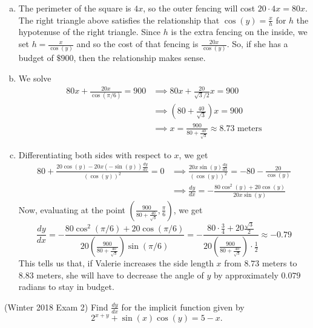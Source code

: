 \documentclass[11pt]{exam}
\newcommand{\dydx}{\frac{dy}{dx}}
\begin{document}
\begin{questions}
\begin{enumerate}[(a)]
\end{enumerate}
\begin{solution}
  \begin{enumerate}[(a)]
  \item The perimeter of the square is \(4x\), so the outer fencing
    will cost \(20 \cdot 4x = 80x\). The right triangle above
    satisfies the relationship that \(\cos(y) = \frac{x}{h}\) for
    \(h\) the hypotenuse of the right triangle. Since \(h\) is the
    extra fencing on the inside, we set \(h = \frac{x}{\cos(y)}\) and
    so the cost of that fencing is \(\frac{20x}{\cos(y)}\). So, if she
    has a budget of \(\$900\), then the relationship makes sense.
  \item We solve
    \begin{align*}
      80x + \frac{20x}{\cos(\pi/6)} = 900
      & \implies 80x + \frac{20}{\sqrt{3}/2} x = 900 \\
      & \implies \left(80+\frac{40}{\sqrt{3}}\right) x = 900 \\
      & \implies x = \frac{900}{80+\frac{40}{\sqrt{3}}} \approx 8.73
        \text{ meters}
    \end{align*}
  \item Differentiating both sides with respect to \(x\), we get \begin{align*}
      80 + \frac{20\cos(y)-20x(-\sin(y))\dydx}{(\cos(y))^2} = 0
      & \implies \frac{20x\sin(y)\dydx}{(\cos(y))^2} =
      -80-\frac{20}{\cos(y)} \\
      & \implies \dydx = - \frac{80\cos^2(y)+20\cos(y)}{20x\sin(y)} 
    \end{align*}
    Now, evaluating at the point
    \(\left(\frac{900}{80+\frac{40}{\sqrt{3}}}, \frac{\pi}{6}
    \right)\), we get \[
      \dydx = -
      \frac{80\cos^2(\pi/6)+20\cos(\pi/6)}{20\left(\frac{900}{80+\frac{40}{\sqrt{3}}}\right)\sin(\pi/6)}
      = -\frac{80\cdot \frac{3}{4} + 20 \frac{\sqrt{3}}{2}}{20
        \left(\frac{900}{80+\frac{40}{\sqrt{3}}}\right) \cdot \frac{1}{2}}
      \approx -0.79
    \]
    This tells us that, if Valerie increases the side length \(x\)
    from \(8.73\) meters to \(8.83\) meters, she will have to
    decrease the angle of \(y\) by approximately \(0.079\) radians to
    stay in budget.
  \end{enumerate}
\end{solution}
\pagebreak
\question (Winter 2018 Exam 2) %
   Find $\displaystyle\frac{dy}{dx}$ for the implicit function given by
   $$2^{x+y} + \sin(x) \cos(y) = 5-x.$$
   \begin{solution}

\end{solution}
\end{questions}
\end{document}

